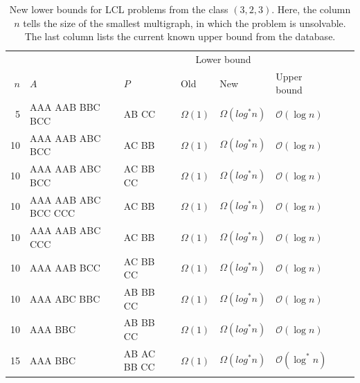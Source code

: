 \begin{table}[H]
    \centering
    \begin{adjustbox}{width={\textwidth},keepaspectratio}%
    \begin{tabular}{rlllllll}
        \toprule
        &&& \multicolumn{2}{c}{Lower bound} \\
        \cmidrule{4-5}
        $n$ & $A$ & $P$ & Old & New & Upper bound\\
        \midrule
        5  & AAA AAB BBC BCC     & AB CC       & $\Omega(1)$ & $\Omega(log^*n)$ & $\mathcal{O}(\log n)$\\
        10 & AAA AAB ABC BCC     & AC BB       & $\Omega(1)$ & $\Omega(log^*n)$ & $\mathcal{O}(\log n)$\\
        10 & AAA AAB ABC BCC     & AC BB CC    & $\Omega(1)$ & $\Omega(log^*n)$ & $\mathcal{O}(\log n)$\\
        10 & AAA AAB ABC BCC CCC & AC BB       & $\Omega(1)$ & $\Omega(log^*n)$ & $\mathcal{O}(\log n)$\\
        10 & AAA AAB ABC CCC     & AC BB       & $\Omega(1)$ & $\Omega(log^*n)$ & $\mathcal{O}(\log n)$\\
        10 & AAA AAB BCC         & AC BB CC    & $\Omega(1)$ & $\Omega(log^*n)$ & $\mathcal{O}(\log n)$\\
        10 & AAA ABC BBC         & AB BB CC    & $\Omega(1)$ & $\Omega(log^*n)$ & $\mathcal{O}(\log n)$\\
        10 & AAA BBC             & AB BB CC    & $\Omega(1)$ & $\Omega(log^*n)$ & $\mathcal{O}(\log n)$\\
        15 & AAA BBC             & AB AC BB CC & $\Omega(1)$ & $\Omega(log^*n)$ & $\mathcal{O}(\log^* n)$\\
        \bottomrule
    \end{tabular}
    \end{adjustbox}
    \caption{%
    New lower bounds for LCL problems from the class $(3,2,3)$.
    Here, the column $n$ tells the size of the smallest multigraph, in which the problem is unsolvable.
    The last column lists the current known upper bound from the database.
    }
    \label{tbl:results:asd2}
\end{table}

